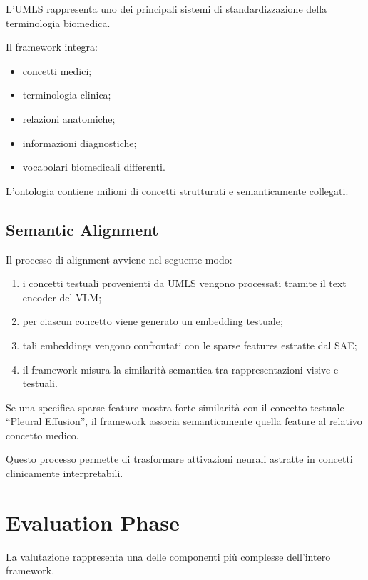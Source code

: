 L'UMLS rappresenta uno dei principali sistemi di standardizzazione della terminologia biomedica.

Il framework integra:

\begin{itemize}
    \item concetti medici;
    \item terminologia clinica;
    \item relazioni anatomiche;
    \item informazioni diagnostiche;
    \item vocabolari biomedicali differenti.
\end{itemize}

L'ontologia contiene milioni di concetti strutturati e semanticamente collegati.

\subsection{Semantic Alignment}

Il processo di alignment avviene nel seguente modo:

\begin{enumerate}
    \item i concetti testuali provenienti da UMLS vengono processati tramite il text encoder del VLM;
    
    \item per ciascun concetto viene generato un embedding testuale;
    
    \item tali embeddings vengono confrontati con le sparse features estratte dal SAE;
    
    \item il framework misura la similarità semantica tra rappresentazioni visive e testuali.
\end{enumerate}

Se una specifica sparse feature mostra forte similarità con il concetto testuale ``Pleural Effusion'', il framework associa semanticamente quella feature al relativo concetto medico.

Questo processo permette di trasformare attivazioni neurali astratte in concetti clinicamente interpretabili.

\section{Evaluation Phase}

La valutazione rappresenta una delle componenti più complesse dell'intero framework.

